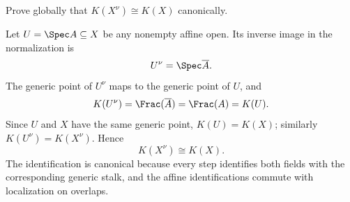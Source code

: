 \begin{problem}\label{prob:vi28-09}
Prove globally that \(K(X^\nu)\cong K(X)\) canonically.

\end{problem}

\ifdefined\FullProblemDossiers
\begin{solution}
Let \(U=\Spec A\subseteq X\) be any nonempty affine open. Its inverse image in the normalization is
\[
U^\nu=\Spec\overline A.
\]
The generic point of \(U^\nu\) maps to the generic point of \(U\), and
\[
K(U^\nu)=\Frac(\overline A)=\Frac(A)=K(U).
\]
Since \(U\) and \(X\) have the same generic point, \(K(U)=K(X)\); similarly
\(K(U^\nu)=K(X^\nu)\). Hence
\[
K(X^\nu)\cong K(X).
\]
The identification is canonical because every step identifies both fields with the corresponding generic stalk, and the affine identifications commute with localization on overlaps.
\end{solution}
\fi
